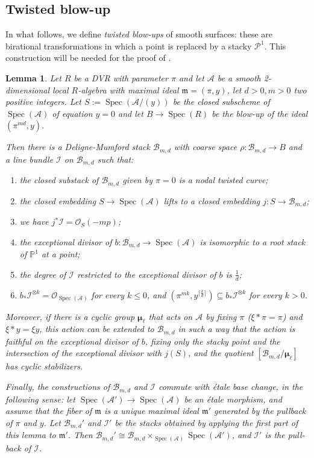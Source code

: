 \documentclass{amsart}
\newcommand{\bP}{\mathbb{P}}
\newcommand{\cA}{\mathcal{A}}
\newcommand{\cB}{\mathcal{B}}
\newcommand{\cI}{\mathcal{I}}
\newcommand{\cO}{\mathcal{O}}
\newcommand{\cP}{\mathcal{P}}
\newcommand{\spec}{\operatorname{Spec}}
\newcommand{\bmu}{\bm{\mu}}
\newtheorem{Lemma}[theorem]{Lemma}
\theoremstyle{definition}
\begin{document}
\subsection{Twisted blow-up}\label{sub:twisted blow-ups}
In what follows, we define \emph{twisted blow-ups} of smooth surfaces: these are birational transformations in which a point is replaced by a stacky $\cP^1$. This construction will be needed for the proof of .
\begin{Lemma}\label{lemma blow up + covering stack does the job}
Let $R$ be a DVR with parameter $\pi$ and let $\cA$ be a smooth 2-dimensional local $R$-algebra with maximal ideal $\mathfrak{m}=(\pi,y)$, let $d> 0, m> 0$ two positive integers. Let $S:=\spec(\cA/(y))$ be the closed subscheme of $\spec(\cA)$ of equation $y=0$ and let $B\to \spec(R)$ be the blow-up of the ideal $(\pi^{md},y)$.

Then there is a Deligne-Mumford stack $\cB_{m,d}$ with coarse space $\rho:\cB_{m,d}\to B$ and a line bundle $\cI$ on $\cB_{m,d}$ such that:
\begin{enumerate}
    \item the closed substack of $\cB_{m,d}$ given by $\pi = 0$ is a nodal twisted curve;
    \item the closed embedding $S\to \spec(\cA)$ lifts to a closed embedding $j:S\to \cB_{m,d}$;
    \item we have $j^*\cI = \cO_S(-mp)$;
    
             \item the exceptional divisor of $b:\cB_{m,d}\to \spec(\cA)$ is isomorphic to a root stack of $\bP^1$ at a point;
    \item the degree of $\cI$ restricted to the exceptional divisor of $b$ is $\frac{1}{d}$;
    \item  $b_*\cI^{\otimes k} = \cO_{\spec(\cA)}$ for every $k\le 0$, and
        $(\pi^{mk},y^{\lceil \frac{k}{d}\rceil})\subseteq b_*\cI^{\otimes k}$ for every $k>0$.
\end{enumerate}

Moreover, if there is a cyclic group $\bmu_\ell$ that acts on $\cA$ by fixing $\pi$ ($\xi*\pi = \pi$) and $\xi*y = \xi y$, this action can be extended to $\cB_{m,d}$ in such a way that the action is faithful on the exceptional divisor of $b$, fixing only the stacky point and the intersection of the exceptional divisor with $j(S)$, and the quotient $[\cB_{m,d}/\bmu_\ell]$ has cyclic stabilizers.

Finally, the constructions of $\cB_{m,d}$ and $\cI$ commute with \'etale base change, in the following sense: let $\spec(\cA')\to \spec(\cA)$ be an \'etale morphism, and assume that the fiber of $\mathfrak{m}$ is a unique maximal ideal $\mathfrak{m}'$ generated by the pullback of $\pi$ and $y$. Let $\cB_{m,d}'$ and $\cI'$ be the stacks obtained by applying the first part of this lemma to $\mathfrak{m}'$. Then $\cB_{m,d}'\cong\cB_{m,d}\times_{\spec(\cA)} \spec(\cA')$, and $\cI'$ is the pull-back of $\cI$.
\end{Lemma}
\end{document}
